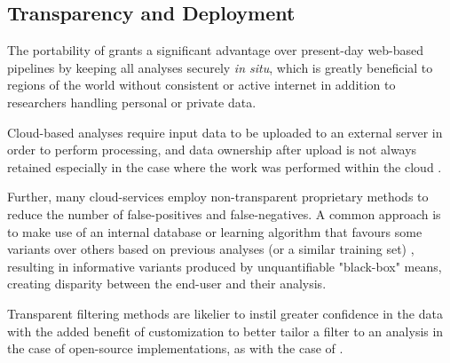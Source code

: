 \subsection{Transparency and Deployment}

The portability of \app grants a significant advantage over present-day web-based pipelines by keeping all analyses securely \textit{in situ}, which is greatly beneficial to regions of the world without consistent or active internet in addition to researchers handling personal or private data.

Cloud-based analyses require input data to be uploaded to an external server in order to perform processing, and data ownership after upload is not always retained especially in the case where the work was performed within the cloud \citep{reed2010information}.

Further, many cloud-services employ non-transparent proprietary methods to reduce the number of false-positives and false-negatives. A common approach is to make use of an internal database or learning algorithm that favours some variants over others based on previous analyses (or a similar training set) \citep{pabinger2014survey}, resulting in informative variants produced by unquantifiable "black-box" means, creating disparity between the end-user and their analysis.

Transparent filtering methods are likelier to instil greater confidence in the data with the added benefit of customization to better tailor a filter to an analysis in the case of open-source implementations, as with the case of \app.


